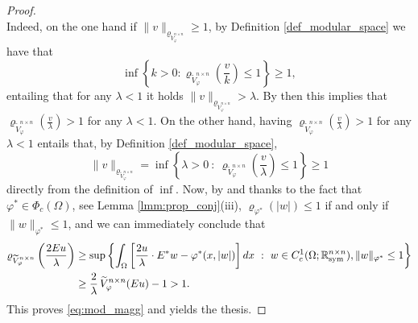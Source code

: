 \documentclass[a4paper,11pt,oneside,notitlepage]{article}
\numberwithin{equation}{section}
\def\R{\mathbb{R}}
\def\sym{{\rm sym}}
\newcommand{\vphi}{\varphi}
\newcommand{\vrho}{\varrho}
\newcommand{\st}{ \ : \ }
\begin{document}
\begin{proof}
\begin{equation}
    \end{equation}
    Indeed, on the one hand if $\|v\|_{\vrho_{\widetilde{V}^{n \times n}_\vphi}} \ge 1$, by Definition \ref{def_modular_space} we have that
    \begin{equation*}
        \inf \left\{ k > 0 : \vrho_{\widetilde{V}^{n \times n}_\vphi}\left( \frac{v}{k} \right) \le 1 \right\} \ge 1,
    \end{equation*}
    entailing that for any $\lambda < 1$ it holds $\|v\|_{\vrho_{\widetilde{V}^{n \times n}_\vphi}} > \lambda$. By \cite[Lemma 3.2.3]{HaH} then this implies that $\vrho_{\widetilde{V}^{n \times n}_\vphi}(\tfrac{v}{\lambda}) > 1$ for any $\lambda < 1$. On the other hand, having $\vrho_{\widetilde{V}^{n \times n}_\vphi}(\tfrac{v}{\lambda}) > 1$ for any $\lambda < 1$ entails that, by Definition \ref{def_modular_space}, 
    \begin{equation*}
        \|v\|_{\vrho_{\widetilde{V}^{n \times n}_\vphi}} =   \inf \left\{ \lambda > 0 \st \vrho_{\widetilde{V}^{n \times n}_\vphi}\left( \frac{v}{\lambda} \right) \le 1 \right\} \ge 1
    \end{equation*}
    directly from the definition of $\inf$. Now, by \cite[Lemma 3.2.3]{HaH} and thanks to the fact that $\vphi^* \in \Phi_c(\Omega)$, see Lemma \ref{lmm:prop_conj}(iii), $\vrho_{\vphi^*}(|w|) \le 1$ if and only if $\|w\|_{\vphi^*} \le 1$, and we can immediately conclude that
    \begin{equation*}
    \begin{aligned}
        \vrho_{\widetilde{V}^{n \times n}_\vphi} \left(\frac{2Eu}{\lambda} \right)
        & \ge \sup \left\{ \int_\Omega \left[ \frac{2 u}{\lambda} \cdot E^* w - \vphi^*(x, |w|) \right] dx \st w \in C^1_c(\Omega; \R^{n \times n}_\sym), \|w\|_{\vphi^*}\le 
        1 \right\} \\
        & \ge \frac{2}{\lambda} \, \widetilde{V}^{n \times n}_\vphi(Eu) - 1 > 1.
    \end{aligned}
    \end{equation*}
    This proves \eqref{eq:mod_magg} and yields the thesis.
\end{proof}
\end{document}
